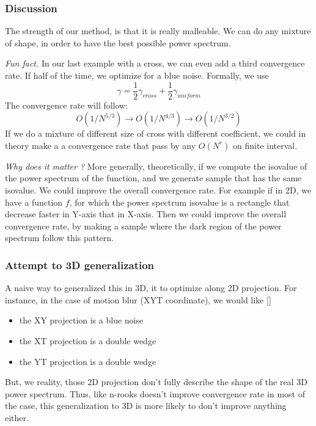 \documentclass{classeENS}
\begin{document}
\subsubsection{Discussion}

    The strength of our method, is that it is really malleable. We can do any mixture
    of shape, in order to have the best possible power spectrum. 
    
\> \textit{Fun fact.} In our last example with a cross, we can even add a third 
    convergence rate. If half of the time, we optimize for a blue noise. Formally, we use
    \[ \gamma =\frac{1}{2}\gamma_{cross} + \frac{1}{2}\gamma_{uniform}\]
    The convergence rate will follow: 
    \[ O(1/N^{5/3}) \to O(1/N^{4/3}) \to O(1/N^{3/2}) \]
    If we do a mixture of different size of cross with different coefficient, we could in theory
    make a a convergence rate that pass by any $O(N^r)$ on finite interval.

\> \textit{Why does it matter ?} More generally, theoretically, if we compute the 
    isovalue of the power spectrum of the function, and we generate sample that has 
    the same isovalue. We could improve the overall convergence rate. For example 
    if in 2D, we have a function $f$, for which the power spectrum isovalue is 
    a rectangle that decrease faster in Y-axis that in X-axis. Then we could improve the overall 
    convergence rate, by making a sample where the dark region of the power spectrum 
    follow this pattern.

\subsubsection{Attempt to 3D generalization}
    A naive way to generalized this in 3D, it to optimize along 2D projection. For instance,
    in the case of motion blur (XYT coordinate), we would like [\cite{singh17convergence}]
    \begin{itemize}
        \item the XY projection is a blue noise
        \item the XT projection is a double wedge
        \item the YT projection is a double wedge
    \end{itemize}
    But, we reality, those 2D projection don't fully describe the shape of the real 
    3D power spectrum. Thus, like n-rooks doesn't improve convergence rate in most 
    of the case, this generalization to 3D is more likely to don't improve anything
    either.
    
\end{document}
